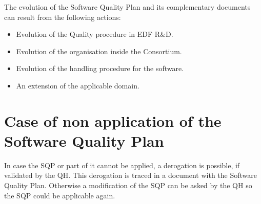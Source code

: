 The evolution of the Software Quality Plan and its complementary documents can
result from the following actions:
\begin{itemize}
\item Evolution of the Quality procedure in EDF R\&D.
\item Evolution of the organisation inside the Consortium.
\item Evolution of the handling procedure for the software.
\item An extension of the applicable domain.
\end{itemize}

\section{Case of non application of the Software Quality Plan}

In case the SQP or part of it cannot be applied, a derogation is possible, if
validated by the QH\@. This derogation is traced in a document with the Software
Quality Plan. Otherwise a modification of the SQP can be asked by the QH so
the SQP could be applicable again.
